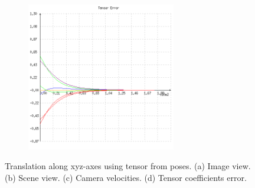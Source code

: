 \begin{figure}[ht!]
\begin{mdframed}[linecolor=black!30,backgroundcolor=black!5]
\begin{subfigure}{.48\linewidth}
    \caption{}
    \label{fig:ex3pvelocity}
  \end{subfigure}
  \begin{subfigure}{.48\linewidth}
    \centering
    \includegraphics[width=65mm]{figures/plots/ex3perror.png}
    \caption{}
    \label{fig:ex3perror}
  \end{subfigure}
  \caption{Translation along xyz-axes using tensor from poses. (a) Image view. (b) Scene view. (c) Camera velocities. (d) Tensor coefficients error.}
  \label{fig:ex3p}
\end{mdframed}
\end{figure}

